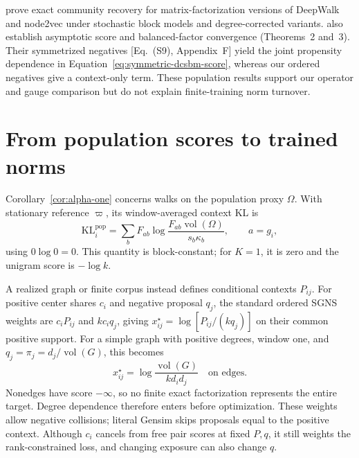 \documentclass[aps,pre,reprint,superscriptaddress,longbibliography]{revtex4-2}
\DeclareMathOperator{\vol}{vol}
\begin{document}
\citet{zhang2022exact} prove exact community recovery for matrix-factorization versions of DeepWalk and node2vec under stochastic block models and degree-corrected variants.
\citet{davison2024community} also establish asymptotic score and balanced-factor convergence (Theorems~2 and~3).
Their symmetrized negatives [Eq.~(S9), Appendix~F] yield the joint propensity dependence in Equation~\eqref{eq:symmetric-dcsbm-score}, whereas our ordered negatives give a context-only term.
These population results support our operator and gauge comparison but do not explain finite-training norm turnover.

\section{From population scores to trained norms}
\label{sec:finite-training-mechanism}

Corollary~\ref{cor:alpha-one} concerns walks on the population proxy \(\Omega\).
With stationary reference \(\varpi\), its window-averaged context KL is
\begin{equation}
    \mathrm{KL}^{\mathrm{pop}}_i
    =\sum_b F_{ab}\log\frac{F_{ab}\vol(\Omega)}{s_b\kappa_b},
    \qquad a=g_i,
    \label{eq:population-context-kl}
\end{equation}
using \(0\log0=0\).
This quantity is block-constant; for \(K=1\), it is zero and the unigram score is \(-\log k\).

A realized graph or finite corpus instead defines conditional contexts \(P_{ij}\).
For positive center shares \(c_i\) and negative proposal \(q_j\), the standard ordered SGNS weights are \(c_iP_{ij}\) and \(kc_iq_j\), giving \(x^\star_{ij}=\log[P_{ij}/(kq_j)]\) on their common positive support.
For a simple graph with positive degrees, window one, and \(q_j=\pi_j=d_j/\vol(G)\), this becomes
\begin{equation}
    x^\star_{ij}=\log\frac{\vol(G)}{kd_id_j}
    \quad\text{on edges}.
    \label{eq:realized-graph-score}
\end{equation}
Nonedges have score \(-\infty\), so no finite exact factorization represents the entire target.
Degree dependence therefore enters before optimization.
These weights allow negative collisions; literal Gensim skips proposals equal to the positive context.
Although \(c_i\) cancels from free pair scores at fixed \(P,q\), it still weights the rank-constrained loss, and changing exposure can also change \(q\).
\end{document}
